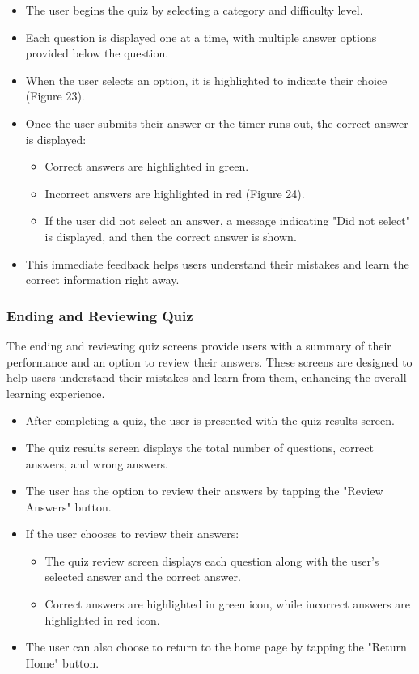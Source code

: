\begin{itemize}
    \item The user begins the quiz by selecting a category and difficulty level.
    \item Each question is displayed one at a time, with multiple answer options provided below the question.
    \item When the user selects an option, it is highlighted to indicate their choice (Figure 23).
    \item Once the user submits their answer or the timer runs out, the correct answer is displayed:
    \begin{itemize}
        \item Correct answers are highlighted in green.
        \item Incorrect answers are highlighted in red (Figure 24).
        \item If the user did not select an answer, a message indicating "Did not select" is displayed, and then the correct answer is shown.
    \end{itemize}
    \item This immediate feedback helps users understand their mistakes and learn the correct information right away.
\end{itemize}

\vspace{1cm}

\subsubsection{Ending and Reviewing Quiz}

The ending and reviewing quiz screens provide users with a summary of their performance and an option to review their answers. These screens are designed to help users understand their mistakes and learn from them, enhancing the overall learning experience.

\begin{itemize}
    \item After completing a quiz, the user is presented with the quiz results screen.
    \item The quiz results screen displays the total number of questions, correct answers, and wrong answers.
    \item The user has the option to review their answers by tapping the "Review Answers" button.
    \item If the user chooses to review their answers:
    \begin{itemize}
        \item The quiz review screen displays each question along with the user's selected answer and the correct answer.
        \item Correct answers are highlighted in green icon, while incorrect answers are highlighted in red icon.
    \end{itemize}
    \item The user can also choose to return to the home page by tapping the "Return Home" button.
\end{itemize}

